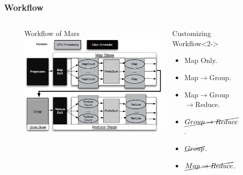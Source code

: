 \begin{frame}
\frametitle{Workflow}
\begin{figure}[ht]
\begin{columns}
\begin{block}{Workflow of Mars}
  \includegraphics[width=1.00\textwidth]{figure/Mars_workflow.eps}
\end{block}
\begin{block}{Customizing Workflow}<2->
\begin{itemize}\footnotesize
\item Map Only.
\item Map$\rightarrow$Group.
\item Map$\rightarrow$Group\\$\rightarrow$Reduce.
\item $\cancel{Group\rightarrow Reduce}$.
\item $\cancel{Group}$.
\item $\cancel{Map\rightarrow Reduce}$.
\end{itemize}
\end{block}
\end{columns}
\end{figure}
\end{frame}

